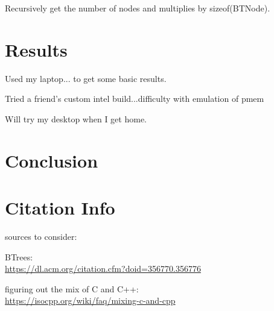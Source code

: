 \documentclass[twocolumn]{article}
\begin{document}
Recursively get the number of nodes and multiplies by sizeof(BTNode).

\section{Results}

Used my laptop... to get some basic results.

Tried a friend's custom intel build...difficulty with emulation of pmem

Will try my desktop when I get home.

\section{Conclusion}

\section{Citation Info}


sources to consider:

BTrees:\\
\url{https://dl.acm.org/citation.cfm?doid=356770.356776}

figuring out the mix of C and C++:\\
\url{https://isocpp.org/wiki/faq/mixing-c-and-cpp}
\end{document}
